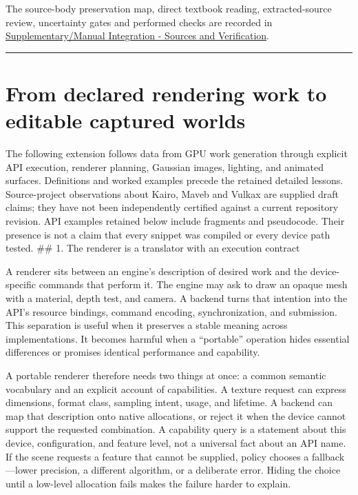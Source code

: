 The source-body preservation map, direct textbook reading, extracted-source review, uncertainty gates and performed checks are recorded in \hyperref[appendix-3b67654799a2]{Supplementary/Manual Integration - Sources and Verification}.

\begin{center}\rule{0.5\linewidth}{0.5pt}\end{center}

\section{From declared rendering work to editable captured worlds}\label{06-engine-ii-ch042-from-declared-rendering-work-to-editable-captured-worlds}

The following extension follows data from GPU work generation through explicit API execution, renderer planning, Gaussian images, lighting, and animated surfaces. Definitions and worked examples precede the retained detailed lessons. Source-project observations about Kairo, Maveb and Vulkax are supplied draft claims; they have not been independently certified against a current repository revision. API examples retained below include fragments and pseudocode. Their presence is not a claim that every snippet was compiled or every device path tested. \#\# 1. The renderer is a translator with an execution contract

A renderer sits between an engine's description of desired work and the device-specific commands that perform it. The engine may ask to draw an opaque mesh with a material, depth test, and camera. A backend turns that intention into the API's resource bindings, command encoding, synchronization, and submission. This separation is useful when it preserves a stable meaning across implementations. It becomes harmful when a ``portable'' operation hides essential differences or promises identical performance and capability.

A portable renderer therefore needs two things at once: a common semantic vocabulary and an explicit account of capabilities. A texture request can express dimensions, format class, sampling intent, usage, and lifetime. A backend can map that description onto native allocations, or reject it when the device cannot support the requested combination. A capability query is a statement about this device, configuration, and feature level, not a universal fact about an API name. If the scene requests a feature that cannot be supplied, policy chooses a fallback---lower precision, a different algorithm, or a deliberate error. Hiding the choice until a low-level allocation fails makes the failure harder to explain.

